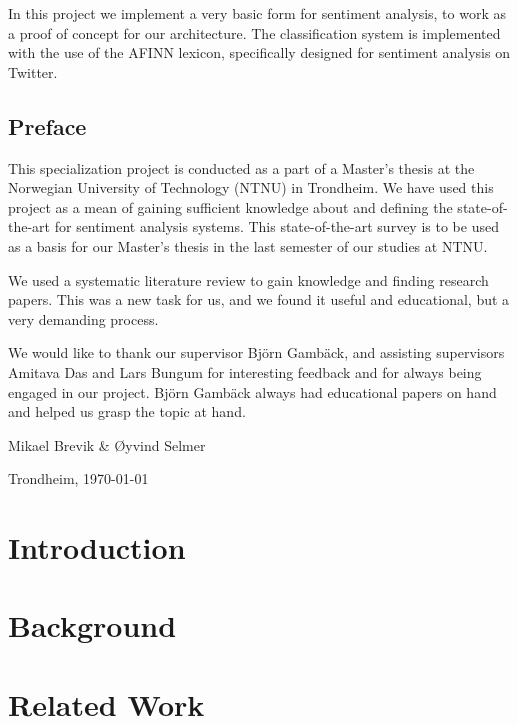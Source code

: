 \documentclass[a4paper, 11pt]{book}
\newcommand{\thesisAuthor}{Mikael Brevik \& Øyvind Selmer}
\begin{document}
In this project we implement a very basic form for sentiment analysis, to work as a proof of concept for our architecture. The classification system is implemented with the use of the AFINN lexicon, specifically designed for sentiment analysis on Twitter.

\clearpage

\section*{Preface}

This specialization project is conducted as a part of a Master's thesis at the Norwegian University of Technology (NTNU) in Trondheim. We have used this project as a mean of gaining sufficient knowledge about and defining the state-of-the-art for sentiment analysis systems. This state-of-the-art survey is to be used as a basis for our Master's thesis in the last semester of our studies at NTNU. 


We used a systematic literature review to gain knowledge and finding research papers. This was a new task for us, and we found it useful and educational, but a very demanding process. 


We would like to thank our supervisor Björn Gambäck, and assisting supervisors Amitava Das and Lars Bungum for interesting feedback and for always being engaged in our project. Björn Gambäck always had educational papers on hand and helped us grasp the topic at hand.


\vfill

\hfill \thesisAuthor

\hfill Trondheim, \today

\clearpage

\tableofcontents

\listoffigures

\listoftables

\mainmatter
\chapter{Introduction}


\chapter{Background}


\chapter{Related Work}

\end{document}
